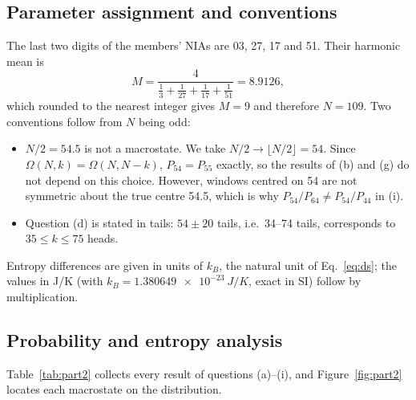 \documentclass[11pt,a4paper]{article}
\begin{document}
\subsection{Parameter assignment and conventions}
The last two digits of the members' NIAs are 03, 27, 17 and 51. Their harmonic mean is
\begin{equation}
  M=\frac{4}{\frac13+\frac1{27}+\frac1{17}+\frac1{51}}=8.9126,
  \label{eq:M}
\end{equation}
which rounded to the nearest integer gives $\boxed{M=9}$ and therefore $\boxed{N=109}$.
Two conventions follow from $N$ being odd:
\begin{itemize}
  \item $N/2=54.5$ is not a macrostate. We take $N/2\to\lfloor N/2\rfloor=54$. Since
  $\Omega(N,k)=\Omega(N,N-k)$, $P_{54}=P_{55}$ exactly, so the results of (b) and (g) do not
  depend on this choice. However, windows centred on 54 are not symmetric about the true centre
  54.5, which is why $P_{54}/P_{64}\neq P_{54}/P_{44}$ in (i).
  \item Question (d) is stated in tails: $54\pm20$ tails, i.e.\ 34--74 tails, corresponds to
  $35\le k\le75$ heads.
\end{itemize}
Entropy differences are given in units of $k_B$, the natural unit of Eq.~\eqref{eq:ds}; the
values in \si{J/K} (with $k_B=\SI{1.380649e-23}{J/K}$, exact in SI) follow by multiplication.

\subsection{Probability and entropy analysis}
Table~\ref{tab:part2} collects every result of questions (a)--(i), and Figure~\ref{fig:part2}
locates each macrostate on the distribution.
\end{document}
